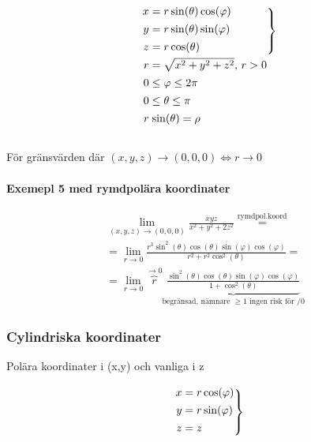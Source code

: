 \documentclass{article}
\begin{document}
\[
	\def\arraystretch{1.1}
	\begin{blockarray}{r@{\;}l}
	\begin{block}{r@{\;}l\}}
		x & = r \sin(\theta) \cos(\varphi) \\[\jot]
		y & = r \sin(\theta) \sin(\varphi) \\[\jot]
		z & = r \cos(\theta) \\[\jot]
	\end{block}
	r & = \sqrt{x^2+y^2+z^2} \text{, } r > 0 \\[\jot]
	0 & \leq \varphi \leq 2\pi \\[\jot]
	0 & \leq \theta \leq \pi \\[\jot]
	r & \sin(\theta) = \rho
	\end{blockarray}
\]

För gränsvärden där \((x,y,z) \rightarrow (0,0,0) \iff r \rightarrow 0\)

\newpage
\paragraph{Exemepl 5 med rymdpolära koordinater}

\[
\begin{split}
	\lim_{(x,y,z) \rightarrow (0,0,0)} \frac{xyz}{x^2+y^2+2z^2} \overset{\mathrm{rymdpol.koord}}{=} \\
	= \lim_{r \rightarrow 0} \frac{r^3 \sin^2(\theta) \cos(\theta) \sin(\varphi) \cos(\varphi)}{r^2+r^2 \cos^2(\theta)} = \\
	= \lim_{r \rightarrow 0} \overbrace{r}^{\rightarrow 0} \underbrace{\frac{\sin^2(\theta) \cos(\theta) \sin(\varphi) \cos(\varphi)}{1+\cos^2(\theta)}}_\text{begränsad, nämnare \(\geq 1 \) ingen risk för /0}
\end{split}
\]

\subsubsection*{Cylindriska koordinater}

Polära koordinater i (x,y) och vanliga i z

\[
	\def\arraystretch{1.1}
	\begin{blockarray}{r@{\;}l}
	\begin{block}{r@{\;}l\}}
		x & = r \cos(\varphi) \\[\jot]
		y & = r \sin(\varphi) \\[\jot]
		z & = z \\[\jot]
	\end{block}
	\end{blockarray}
\]


\newpage
\begin{appendix}
	\listoffigures
	\listoftables
\end{appendix}
\end{document}
